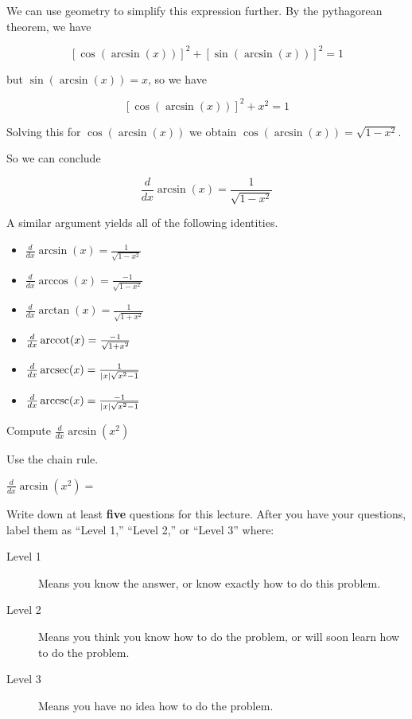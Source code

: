 \documentclass{ximera}
\begin{document}
We can use geometry to simplify this expression further.  By the pythagorean theorem, we have

\[
\left[\cos(\arcsin(x))\right]^2+\left[\sin(\arcsin(x))\right]^2=1
\] 

but $\sin(\arcsin(x)) = x$, so we have

\[
\left[\cos(\arcsin(x))\right]^2+x^2=1
\]

Solving this for $\cos(\arcsin(x))$ we obtain $\cos(\arcsin(x))=\sqrt{1-x^2}$.

So we can conclude

\[
\frac{d}{dx} \arcsin(x) = \frac{1}{\sqrt{1-x^2}}
\]

A similar argument yields all of the following identities.

\begin{itemize}
\item $\frac{d}{dx} \arcsin(x) = \frac{1}{\sqrt{1-x^2}}$
\item $\frac{d}{dx} \arccos(x) = \frac{-1}{\sqrt{1-x^2}}$
\item $\frac{d}{dx} \arctan(x) = \frac{1}{\sqrt{1+x^2}}$
\item $\frac{d}{dx} \operatorname{arccot}(x) = \frac{-1}{\sqrt{1+x^2}}$
\item $\frac{d}{dx} \operatorname{arcsec}(x) = \frac{1}{|x|\sqrt{x^2-1}}$
\item $\frac{d}{dx} \operatorname{arccsc}(x) = \frac{-1}{|x|\sqrt{x^2-1}}$
\end{itemize}

\begin{question}
	Compute $\frac{d}{dx} \arcsin(x^2)$
		\begin{hint}
			Use the chain rule.
		\end{hint}
		$\frac{d}{dx} \arcsin(x^2)=$
\end{question}

\begin{question}
Write down at least \textbf{five} questions for this lecture. After
you have your questions, label them as ``Level 1,'' ``Level 2,'' or ``Level 3'' where:
\begin{description}
\item[Level 1] Means you know the answer, or know exactly how to do this problem.
\item[Level 2] Means you think you know how to do the problem, or will soon learn how to do the problem.
\item[Level 3] Means you have no idea how to do the problem. 
\end{description}
  \begin{freeResponse}
  \end{freeResponse}
\end{question}
\end{document}
